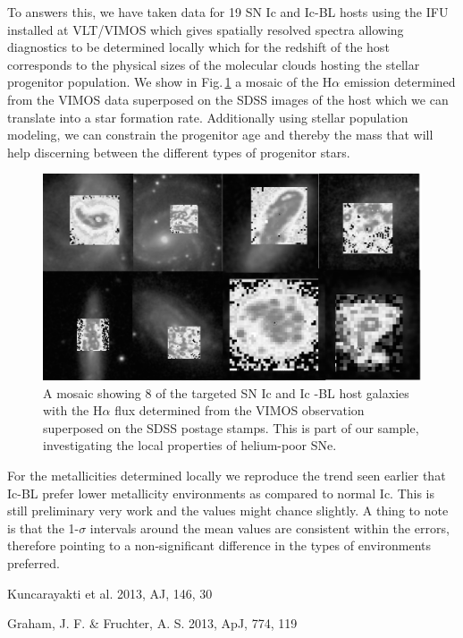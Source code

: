 \documentclass{iau_FM}
\begin{document}
To answers this, we have taken data for 19 SN Ic and Ic-BL hosts using the IFU
installed at VLT/VIMOS which gives spatially resolved spectra allowing
diagnostics
to be determined locally which for the redshift of the host
corresponds to the
physical sizes of the molecular clouds hosting the stellar
progenitor
population. We show in Fig.\,\ref{fig:intro:snifu} a mosaic of the
H$\alpha$
emission determined from the VIMOS data superposed on the SDSS images
of the
host which we can translate into a star formation rate. Additionally
using
stellar population modeling, we can constrain the progenitor age and
thereby the
mass that will help discerning between the different types of
progenitor stars. 



\begin{figure}[htb]
	
	\includegraphics[width=\textwidth]{gfx/ifu}
	
	\caption{A mosaic showing 8 of the targeted SN Ic and Ic -BL host galaxies with the H$\alpha$ flux determined from the VIMOS observation superposed on the SDSS postage stamps. This is part of our sample, investigating the local properties of helium-poor SNe. }
	
	\label{fig:intro:snifu}
\end{figure}

For the metallicities determined locally we reproduce the trend seen earlier
that Ic-BL prefer lower metallicity environments as compared to normal Ic.
 This is still preliminary very work
and the values might chance slightly. A thing to note is that the 1-$\sigma$
intervals around the mean values are consistent within the errors, therefore
pointing to a non-significant difference in the types of environments preferred.





\begin{thebibliography}{}



{Kuncarayakti et al. 2013, AJ, 146, 30}

{Graham, J. F. \& Fruchter, A. S. 2013, ApJ, 774, 119}


\end{thebibliography}
\end{document}
